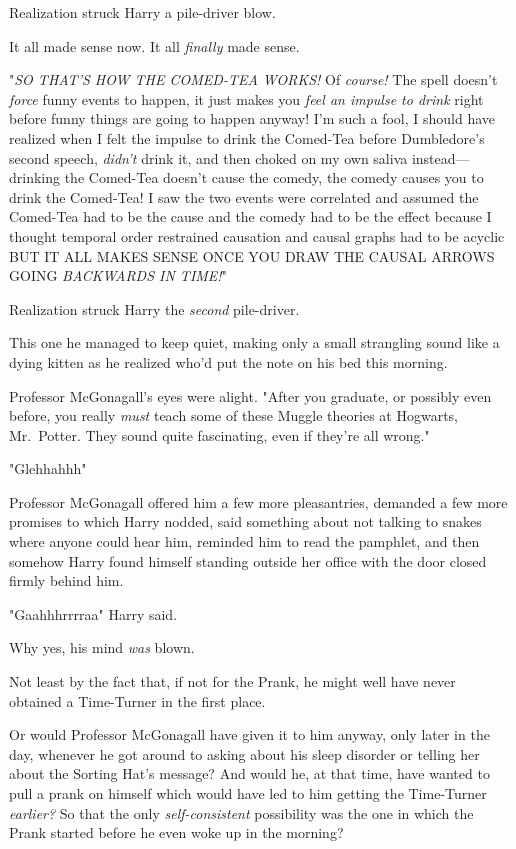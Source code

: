 Realization struck Harry a pile-driver blow.

It all made sense now. It all \emph{finally} made sense.

"\emph{SO THAT'S HOW THE COMED-TEA WORKS!} Of \emph{course!} The spell doesn't
\emph{force} funny events to happen, it just makes you \emph{feel an impulse to
drink} right before funny things are going to happen anyway! I'm such a fool, I
should have realized when I felt the impulse to drink the Comed-Tea before
Dumbledore's second speech, \emph{didn't} drink it, and then choked on my own
saliva instead—drinking the Comed-Tea doesn't cause the comedy, the comedy
causes you to drink the Comed-Tea! I saw the two events were correlated and
assumed the Comed-Tea had to be the cause and the comedy had to be the effect
because I thought temporal order restrained causation and causal graphs had to
be acyclic BUT IT ALL MAKES SENSE ONCE YOU DRAW THE CAUSAL ARROWS GOING
\emph{BACKWARDS IN TIME!}"

Realization struck Harry the \emph{second} pile-driver.

This one he managed to keep quiet, making only a small strangling sound like a
dying kitten as he realized who'd put the note on his bed this morning.

Professor McGonagall's eyes were alight. "After you graduate, or possibly even
before, you really \emph{must} teach some of these Muggle theories at Hogwarts,
Mr.~Potter. They sound quite fascinating, even if they're all wrong."

"Glehhahhh{\el}"

Professor McGonagall offered him a few more pleasantries, demanded a few more
promises to which Harry nodded, said something about not talking to snakes
where anyone could hear him, reminded him to read the pamphlet, and then
somehow Harry found himself standing outside her office with the door closed
firmly behind him.

"Gaahhhrrrraa{\el}" Harry said.

Why yes, his mind \emph{was} blown.

Not least by the fact that, if not for the Prank, he might well have never
obtained a Time-Turner in the first place.

Or would Professor McGonagall have given it to him anyway, only later in the
day, whenever he got around to asking about his sleep disorder or telling her
about the Sorting Hat's message? And would he, at that time, have wanted to
pull a prank on himself which would have led to him getting the Time-Turner
\emph{earlier?} So that the only \emph{self-consistent} possibility was the one
in which the Prank started before he even woke up in the morning{\el}?

